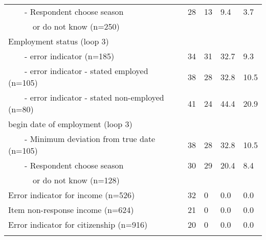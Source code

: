 \begin{table}[h]
\begin{tabularx}{\textwidth}{lXXXX}
		  \ \ \ \ - Respondent choose season              &  28       &13&	9.4&3.7	 \\  \addlinespace
		\ \ \ \ \ \ or do not know  (n=250)                                  	&&			&& \\ \addlinespace \midrule \addlinespace
		Employment status (loop 3)                                     	 				&             &  &    &             \\ \addlinespace
		  \ \ \ \ - error indicator (n=185)  	&34			&     31  &  32.7&9.3\\ \addlinespace
		  \ \ \ \ - error indicator - stated employed (n=105)         &38    &   28& 32.8&  10.5  \\  \addlinespace
		  \ \ \ \ - error indicator - stated non-employed (n=80)  & 41  & 24  &44.4&20.9            \\  \addlinespace  \addlinespace
		begin date of employment (loop 3)                           &&   						&               &  \\ \addlinespace
		  \ \ \ \ - Minimum deviation from true date (n=105)          & 38  &28& 32.8	&10.5	\\  \addlinespace
		  \ \ \ \ - Respondent choose season          &  30           &29&	20.4&8.4	 \\  \addlinespace
		\ \ \ \ \ \ or do not know  (n=128)                        &&           				&& \\ \addlinespace \midrule \addlinespace
		Error indicator for income     (n=526)                            	 		 &32 &               	0&0.0&0.0 \\ \addlinespace
		Item non-response income (n=624)	     &                            21&               	0&0.0&0.0 \\ \addlinespace
		Error indicator for citizenship (n=916)                                       &20&              	0&0.0&0.0 \\ \addlinespace
		\bottomrule                         
	\end{tabularx}
\end{table}